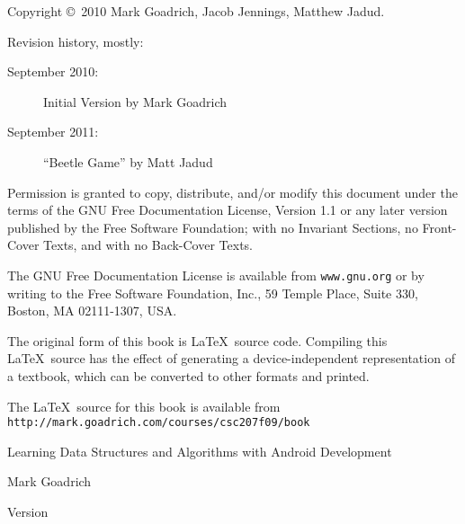 \documentclass[10pt]{book}
\newcommand{\thetitle}{Learning Data Structures and Algorithms with Android Development}
\begin{document}
\begin{latexonly}
\pagebreak
\thispagestyle{empty}

{\small
Copyright \copyright ~2010 Mark Goadrich, Jacob Jennings, Matthew Jadud.

Revision history, mostly:

\begin{description}

\item[September 2010:] Initial Version by Mark Goadrich
\item[September 2011:] ``Beetle Game'' by Matt Jadud

\end{description}

\vspace{0.2in}

Permission is granted to copy, distribute, and/or modify this document
under the terms of the GNU Free Documentation License, Version 1.1 or
any later version published by the Free Software Foundation; with no
Invariant Sections, no Front-Cover Texts, and with no Back-Cover Texts.

The GNU Free Documentation License is available from {\tt www.gnu.org}
or by writing to the Free Software Foundation, Inc., 59 Temple Place,
Suite 330, Boston, MA 02111-1307, USA.

The original form of this book is \LaTeX\ source code.  Compiling this
\LaTeX\ source has the effect of generating a device-independent
representation of a textbook, which can be converted to other formats
and printed.

The \LaTeX\ source for this book is available from
{\tt http://mark.goadrich.com/courses/csc207f09/book}

\vspace{0.2in}

} %

\end{latexonly}



\begin{htmlonly}


{\Huge \thetitle}

{\Large Mark Goadrich}

Version \theversion

\setcounter{chapter}{-1}

\end{htmlonly}
\end{document}

